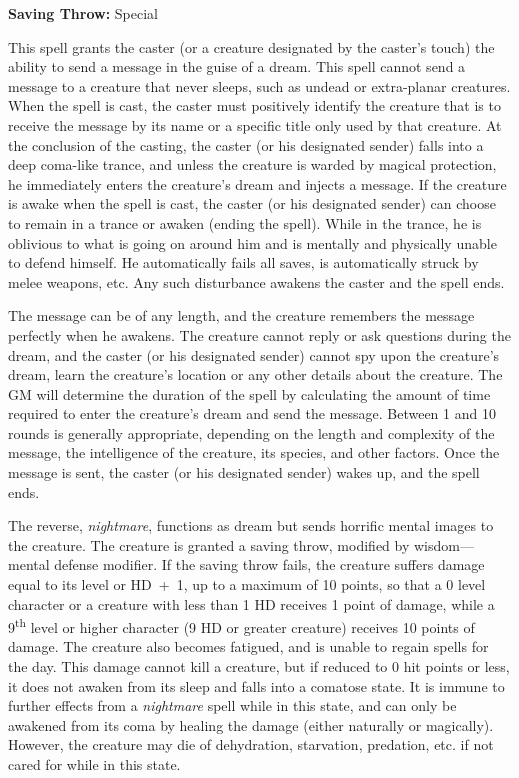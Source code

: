 \begin{multicols}{2}
\begin{minipage}{\columnwidth}
\noindent \textbf{Saving Throw:} Special

\end{minipage}

This spell grants the caster (or a creature designated by the caster's touch) the ability to send a message in the guise of a dream.  This spell cannot send a message to a creature that never sleeps, such as undead or extra-planar creatures.  When the spell is cast, the caster must positively identify the creature that is to receive the message by its name or a specific title only used by that creature.  At the conclusion of the casting, the caster (or his designated sender) falls into a deep coma-like trance, and unless the creature is warded by magical protection, he immediately enters the creature's dream and injects a message.  If the creature is awake when the spell is cast, the caster (or his designated sender) can choose to remain in a trance or awaken (ending the spell).  While in the trance, he is oblivious to what is going on around him and is mentally and physically unable to defend himself.  He automatically fails all saves, is automatically struck by melee weapons, etc.  Any such disturbance awakens the caster and the spell ends.

The message can be of any length, and the creature remembers the message perfectly when he awakens.  The creature cannot reply or ask questions during the dream, and the caster (or his designated sender) cannot spy upon the creature's dream, learn the creature's location or any other details about the creature.  The GM will determine the duration of the spell by calculating the amount of time required to enter the creature's dream and send the message.  Between 1 and 10 rounds is generally appropriate, depending on the length and complexity of the message, the intelligence of the creature, its species, and other factors.  Once the message is sent, the caster (or his designated sender) wakes up, and the spell ends.
 
The reverse, \textit{nightmare}, functions as dream but sends horrific mental images to the creature.  The creature is granted a saving throw, modified by wisdom---mental defense modifier.  If the saving throw fails, the creature suffers damage equal to its level or HD~+~1, up to a maximum of 10 points, so that a 0 level character or a creature with less than 1 HD receives 1 point of damage, while a 9\textsuperscript{th} level or higher character (9 HD or greater creature) receives 10 points of damage.  The creature also becomes fatigued, and is unable to regain spells for the day.  This damage cannot kill a creature, but if reduced to 0 hit points or less, it does not awaken from its sleep and falls into a comatose state.  It is immune to further effects from a \textit{nightmare} spell while in this state, and can only be awakened from its coma by healing the damage (either naturally or magically).  However, the creature may die of dehydration, starvation, predation, etc. if not cared for while in this state.  


\end{multicols}
